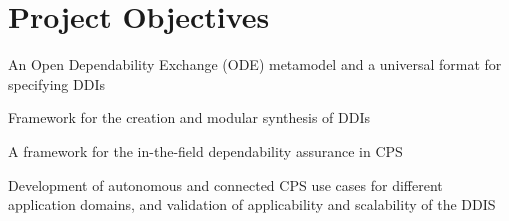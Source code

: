 \section{Project Objectives}

An Open Dependability Exchange (ODE) metamodel and a universal format for specifying DDIs


Framework for the creation and modular synthesis of DDIs

A framework for the in-the-field dependability assurance in CPS

Development of autonomous and connected CPS use cases for different application domains, and validation of applicability and scalability of the DDIS